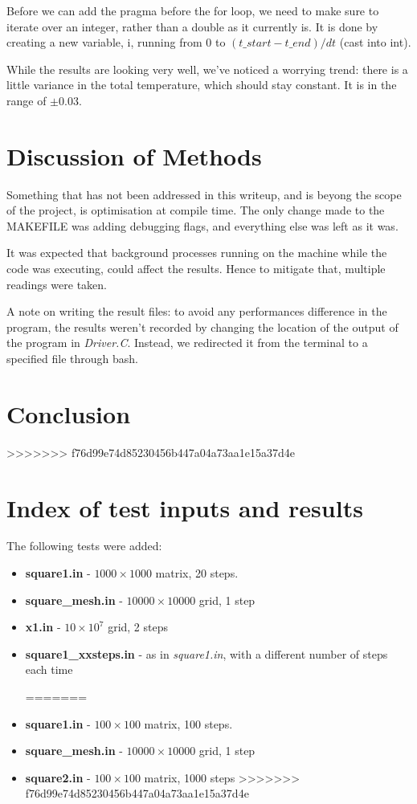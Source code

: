 \documentclass[11pt,journal]{IEEEtran}
\begin{document}
	Before we can add the pragma before the for loop, we need to make sure to iterate over an integer, rather than a double as it currently is. It is done by creating a new variable, i, running from 0 to $(t\_start - t\_end) / dt$ (cast into int).
	
	While the results are looking very well, we've noticed a worrying trend: there is a little variance in the total temperature, which should stay constant. It is in the range of $\pm 0.03$.
	
	\section{Discussion of Methods}
	Something that has not been addressed in this writeup, and is beyong the scope of the project, is optimisation at compile time. The only change made to the MAKEFILE was adding debugging flags, and everything else was left as it was.
	
	It was expected that background processes running on the machine while the code was executing, could affect the results. Hence to mitigate that, multiple readings were taken.
	
	A note on writing the result files: to avoid any performances difference in the program, the results weren't recorded by changing the location of the output of the program in \emph{Driver.C}. Instead, we redirected it from the terminal to a specified file through bash.
	
	\section{Conclusion}
>>>>>>> f76d99e74d85230456b447a04a73aa1e15a37d4e
	
	
	
	
		
		
	\appendices
	\section{Index of test inputs and results}
	The following tests were added:
	\begin{itemize}
<<<<<<< HEAD
		\item \textbf{square1.in} - $1000 \times 1000$ matrix, 20 steps.
		\item \textbf{square\_mesh.in} - $10000 \times 10000$ grid, 1 step
		\item \textbf{x1.in} - $10 \times 10^7$ grid, 2 steps
		\item \textbf{square1\_xxsteps.in} - as in \emph{square1.in}, with a different number of steps each time

=======
		\item \textbf{square1.in} - $100 \times 100$ matrix, 100 steps.
		\item \textbf{square\_mesh.in} - $10000 \times 10000$ grid, 1 step
		\item \textbf{square2.in} - $100 \times 100$ matrix, 1000 steps
>>>>>>> f76d99e74d85230456b447a04a73aa1e15a37d4e
	\end{itemize}
	
\end{document}
